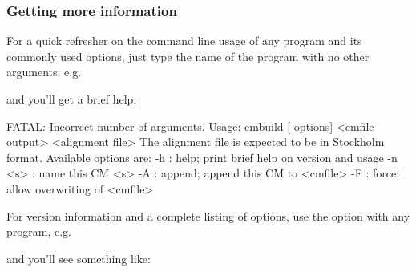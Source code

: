 %


\subsubsection{Getting more information}

For a quick refresher on the command line usage of any program and its
commonly used options, just type the name of the program with no other
arguments: e.g.\


and you'll get a brief help:

\begin{sreoutput}
FATAL: Incorrect number of arguments.
Usage: cmbuild [-options] <cmfile output> <alignment file>
The alignment file is expected to be in Stockholm format.
  Available options are:
   -h     : help; print brief help on version and usage
   -n <s> : name this CM <s>
   -A     : append; append this CM to <cmfile>
   -F     : force; allow overwriting of <cmfile>
\end{sreoutput}

For version information and a complete listing of options, use the
 option with any program, e.g.\


and you'll see something like:

